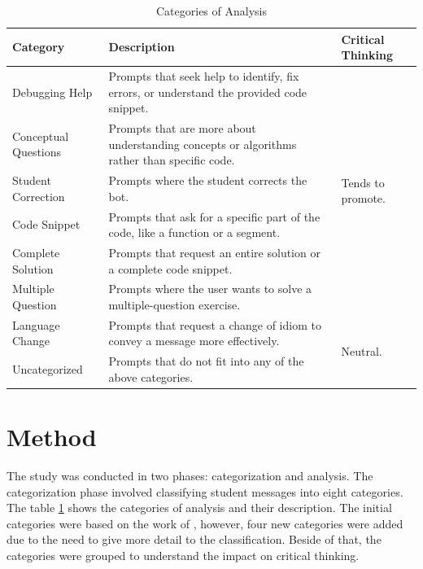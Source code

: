 \documentclass[conference]{IEEEtran}
\begin{document}
\begin{table}[htbp]
\caption{Categories of Analysis}
    \begin{center}
    \begin{tabular}{|p{3cm}|p{5cm}|p{3cm}|}
    \hline
    \textbf{Category} & \textbf{Description} & \textbf{Critical Thinking} \\
    \hline
    Debugging Help & Prompts that seek help to identify, fix errors, or understand the provided code snippet. & \multirow{6}{3cm}{Tends to promote.} \\
    Conceptual Questions & Prompts that are more about understanding concepts or algorithms rather than specific code. & \\
    Student Correction & Prompts where the student corrects the bot. & \\
    \hline
    Code Snippet & Prompts that ask for a specific part of the code, like a function or a segment. & \multirow{6}{3cm}{Tends not to promote.} \\
    Complete Solution & Prompts that request an entire solution or a complete code snippet. & \\
    Multiple Question & Prompts where the user wants to solve a multiple-question exercise. & \\
    \hline
    Language Change & Prompts that request a change of idiom to convey a message more effectively. & \multirow{3}{3cm}{Neutral.} \\
    Uncategorized & Prompts that do not fit into any of the above categories. & \\
    \hline
    \end{tabular}
    \label{tab:categories}
    \end{center}
\end{table}

\section{Method}

The study was conducted in two phases: categorization and analysis. The
categorization phase involved classifying student messages into eight
categories. The table \ref{tab:categories} shows the categories of analysis
and their description. The initial categories were based on the work
of \cite{Ghimire24}, however, four new categories were added due to the need to
give more detail to the classification. Beside of that, the categories were
grouped to understand the impact on critical thinking.
\end{document}
